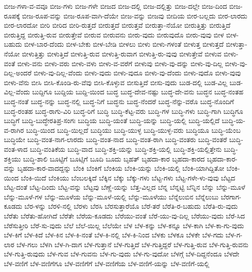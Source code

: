 {ಬೀಜ-ಗಳಾ-ವ-ವವೂ
ಬೀಜ-ಗಳು
ಬೀಜ-ಗಳೇ
ಬೀಜದ
ಬೀಜ-ದಲ್ಲಿ
ಬೀಜ-ದಲ್ಲಿತ್ತು
ಬೀಜ-ದಲ್ಲೇ
ಬೀಜ-ದಿಂದ
ಬೀಜ-ರೂಪಕ್ಕೆ
ಬೀಜ-ರೂಪ-ವನ್ನು
ಬೀಜ-ರೂಪ-ವಾಗಿ-ದೆಯೇ
ಬೀಜ-ವನ್ನು
ಬೀಜವು
ಬೀದಿಯ
ಬೀರ-ಬಲ್ಲದು
ಬೀರ-ಲಾರದು
ಬೀರ-ಲಾರದೋ
ಬೀರಿ
ಬೀರಿದ
ಬೀರಿ-ರುತ್ತದೆ
ಬೀರುತ್ತದೆ
ಬೀರುತ್ತವೆ
ಬೀರುತ್ತಾ-ನೆಯೋ
ಬೀರುತ್ತಿತ್ತು
ಬೀರುತ್ತಿದೆ
ಬೀರುತ್ತಿದ್ದ
ಬೀರುತ್ತಿ-ರುವ
ಬೀರುತ್ತೇವೆ
ಬೀರುವ
ಬೀರುವನು
ಬೀರು-ವುದು
ಬೀರುವುದೊ
ಬೀರು-ವುವು
ಬೀಳ
ಬೀಳ-ಬಹುದು
ಬೀಳ-ಬಾರ-ದೆಂದು
ಬೀಳ-ಬೇಕು
ಬೀಳ-ಬೇಡಿ
ಬೀಳಲು
ಬೀಳು
ಬೀಳು-ಗಳಂತೆ
ಬೀಳುತ್ತ
ಬೀಳುತ್ತದೆ
ಬೀಳುತ್ತಾ-ನೆಯೋ
ಬೀಳುತ್ತಿತ್ತು
ಬೀಳುತ್ತಿದೆ
ಬೀಳುತ್ತಿ-ರುವ
ಬೀಳುತ್ತಿ-ರುವಾಗ
ಬೀಳುತ್ತಿ-ರು-ವುವು
ಬೀಳುತ್ತೇವೆ
ಬೀಳುವ
ಬೀಳು-ವಂತೆ
ಬೀಳು-ವನು
ಬೀಳು-ವರು
ಬೀಳು-ವಳು
ಬೀಳು-ವ-ವರೆಗೆ
ಬೀಳುವು
ಬೀಳು-ವು-ದನ್ನು
ಬೀಳು-ವು-ದಿಲ್ಲ
ಬೀಳು-ವು-ದಿಲ್ಲ-ಅಂದರೆ
ಬೀಳು-ವು-ದಿಲ್ಲ-ವೆಂದು
ಬೀಳು-ವುದು
ಬೀಳು-ವುದೂ
ಬೀಳು-ವು-ದೆಂದು
ಬೀಳು-ವುದೊ
ಬೀಳು-ವುವು
ಬೀಳು-ವೆನು
ಬೀಸಿ
ಬೀಸಿ-ಕೊಂಡಿ-ರು-ವೆವು
ಬೀಸಿ-ಕೊಳ್ಳುವ
ಬೀಸುತ್ತಿದೆ
ಬೀಸು-ವುದು
ಬುಡ-ದಲ್ಲಿ
ಬುಡ-ವಿಲ್ಲ
ಬುಡ-ವಿಲ್ಲ-ವೆಂದು
ಬುದ್ದಿಗೂ
ಬುದ್ದಿಯ
ಬುದ್ದಿ-ಯಿಂದ
ಬುದ್ಧ
ಬುದ್ಧ-ದೇವ-ನಷ್ಟು
ಬುದ್ಧ-ದೇ-ವನು
ಬುದ್ಧನ
ಬುದ್ಧ-ನಂತಹ
ಬುದ್ಧ-ನಂತೆ
ಬುದ್ಧ-ನನ್ನು
ಬುದ್ಧ-ನಲ್ಲಿ
ಬುದ್ಧ-ನಿಗೆ
ಬುದ್ಧನು
ಬುದ್ಧ-ನೆಂದರೆ
ಬುದ್ಧ-ನೆನ್ನು-ವರೊ
ಬುದ್ಧ-ನೊಂದಿಗೆ
ಬುದ್ಧ-ರಂತಹ
ಬುದ್ಧ-ರಾಗು-ವಿರಿ
ಬುದ್ಧ-ರಿಗೆ
ಬುದ್ಧಿ
ಬುದ್ಧಿ-ಕೆಟ್ಟ-ವರು
ಬುದ್ಧಿ-ಗಳ
ಬುದ್ಧಿ-ಗಳು
ಬುದ್ಧಿ-ಗಾಗಿ
ಬುದ್ಧಿಗೂ
ಬುದ್ಧಿಗೆ
ಬುದ್ಧಿ-ಬುದ್ಧೇರತಿಪ್ರ-ಸಂಗಃ
ಬುದ್ಧಿಯ
ಬುದ್ಧಿ-ಯಂತೆ
ಬುದ್ಧಿ-ಯನ್ನು
ಬುದ್ಧಿ-ಯಲ್ಲಿ
ಬುದ್ಧಿ-ಯಲ್ಲಿದೆ
ಬುದ್ಧಿ-ಯ-ವ-ರಾಗಿರ
ಬುದ್ಧಿ-ಯಿಂದ
ಬುದ್ಧಿ-ಯಿಲ್ಲದೆ
ಬುದ್ಧಿಯು
ಬುದ್ಧಿ-ಯುಳ್ಳ
ಬುದ್ಧಿ-ಯುಳ್ಳ-ವರು
ಬುದ್ಧಿಯೂ
ಬುದ್ಧಿ-ಯೆಂಬ
ಬುದ್ಧಿಯೇ
ಬುದ್ಧಿ-ವಂತ-ನಾಗ-ಲಾರದು
ಬುದ್ಧಿ-ವಂತ-ನಾದ
ಬುದ್ಧಿ-ವಂತ-ರಾಗಿ
ಬುದ್ಧಿ-ವಂತರು
ಬುದ್ಧಿ-ವಂತರೆ
ಬುದ್ಧಿ-ವಂತ-ಳಾದ
ಬುದ್ಧಿ-ವಂತಿಕೆಯ
ಬುದ್ಧಿ-ವಾದ
ಬುದ್ಧಿ-ಶಕ್ತಿ-ಯನ್ನು
ಬುದ್ಧಿ-ಶಕ್ತಿ-ಯಲ್ಲಿ
ಬುದ್ಧಿ-ಶಕ್ತಿ-ಯಲ್ಲಿತ್ತೇನು
ಬುದ್ಧಿ-ಶಕ್ತಿಯು
ಬುದ್ಧಿ-ಶಾಲಿ
ಬೂಟ್ಟಿಗೆ
ಬೂಟ್ಸಿಗೆ
ಬೂದಿ
ಬೂದು
ಬೃಹತ್
ಬೃಹದಾ-ಕಾರ
ಬೃಹದಾ-ಕಾರದ
ಬೃಹದಾ-ಕಾರ-ವನ್ನು
ಬೃಹದಾ-ಕಾರ-ವಾದದ್ದನ್ನು
ಬೆಂಕಿ
ಬೆಂಕಿಗೆ
ಬೆಂಕಿಯ
ಬೆಂಕಿ-ಯನ್ನು
ಬೆಂಕಿ-ಯಲ್ಲಿ
ಬೆಂಕಿ-ಯಾಗಿದ್ದಿತೋ
ಬೆಂಕಿ-ಯಿಂದ
ಬೆಂಕಿ-ಯಿದೆ
ಬೆಂಕಿಯು
ಬೆಂಬಲಕ್ಕಿದೆ
ಬೆಕ್ಕಿನ
ಬೆಕ್ಕು
ಬೆಕ್ಕು-ಗಳು
ಬೆಟ್ಟ-ಗಳು
ಬೆಟ್ಟ-ಗಳೇ-ಳು-ವುವು
ಬೆಟ್ಟದ
ಬೆಟ್ಟ-ದಂತೆ
ಬೆಟ್ಟ-ದಿಂದು
ಬೆಟ್ಟ-ವನ್ನು
ಬೆಟ್ಟವು
ಬೆಣ್ಣೆ-ಯನ್ನು
ಬೆತ್ತ-ವಿಲ್ಲದ
ಬೆನ್ನ
ಬೆನ್ನಟ್ಟಿ
ಬೆನ್ನಿನ
ಬೆನ್ನು
ಬೆನ್ನು-ಮೂಳೆ
ಬೆನ್ನು-ಮೂಳೆ-ಗಳ
ಬೆನ್ನು-ಮೂಳೆಯ
ಬೆನ್ನು-ಮೂಳೆ-ಯಲ್ಲಿ
ಬೆನ್ನು-ಮೂಳೆಯು
ಬೆನ್ನೆಲುಬಿನ
ಬೆನ್ನೆಲುಬು
ಬೆರಗಾಗ-ಕೂಡದು
ಬೆರ-ಳನ್ನು
ಬೆರಳಿ-ನಲ್ಲಿ
ಬೆರಳು
ಬೆರಸಿ
ಬೆರಸುತ್ತಾರೆಯೊ
ಬೆರೆ-ತರೆ
ಬೆರೆತಿ-ರ-ಬಹುದು
ಬೆರೆತಿ-ರು-ವುದು
ಬೆರೆತು
ಬೆರೆತು-ಹೋಗಿದೆ
ಬೆರೆತೇ
ಬೆರೆಯ-ಕೂಡದು
ಬೆರೆಯು-ವಂತೆ
ಬೆರೆ-ಯು-ವು-ದಿಲ್ಲ
ಬೆರೆಯು-ವುದು
ಬೆರೆ-ಸಿದ
ಬೆರೆಸುತ್ತೀರಿ
ಬೆರೆ-ಸು-ವುದು
ಬೆಲೆ
ಬೆಲೆ-ಯಿಲ್ಲ
ಬೆಲೆಯೇ
ಬೆಳ
ಬೆಳ-ಕನ್ನು
ಬೆಳ-ಕನ್ನೂ
ಬೆಳ-ಕಾಗಿ
ಬೆಳ-ಕಾ-ಗು-ವುದು
ಬೆಳ-ಕಿಗೆ
ಬೆಳ-ಕಿದೆ
ಬೆಳ-ಕಿನ
ಬೆಳ-ಕಿ-ನಂತೆ
ಬೆಳ-ಕಿ-ನಲ್ಲಿ
ಬೆಳ-ಕಿ-ನಿಂದ
ಬೆಳಕು
ಬೆಳಕೂ
ಬೆಳಕೇ
ಬೆಳ-ಗದು
ಬೆಳ-ಗ-ಲಾರ
ಬೆಳ-ಗಲು
ಬೆಳಗಿ
ಬೆಳ-ಗಿ-ದಾಗ
ಬೆಳ-ಗುತ್ತಾನೆ
ಬೆಳ-ಗುತ್ತಿದೆ
ಬೆಳ-ಗುತ್ತಿದ್ದರೆ
ಬೆಳ-ಗುತ್ತಿ-ರುವ
ಬೆಳ-ಗುತ್ತಿ-ರುವನು
ಬೆಳ-ಗುತ್ತಿ-ರುವುದು
ಬೆಳ-ಗುವ
ಬೆಳ-ಗುವನು
ಬೆಳ-ಗು-ವುದು
ಬೆಳ-ಗು-ವುದೋ
ಬೆಳಗ್ಗೆ
ಬೆಳ-ದಿದ್ದನೆಂದೂ
ಬೆಳದೇ
ಬೆಳ-ವಣಿಗೆ
ಬೆಳ-ವಣಿಗೆಗೂ
ಬೆಳ-ವಣಿಗೆಗೆ
ಬೆಳ-ವಣಿಗೆಯ
ಬೆಳ-ವಣಿಗೆ-ಯನ್ನು
ಬೆಳ-ವಣಿಗೆ-ಯಲ್ಲಿ
}

